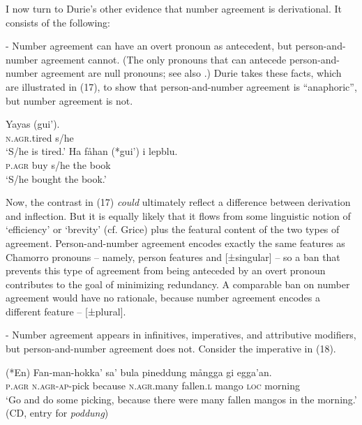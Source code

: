 \documentclass[output=paper,
modfonts
]{LSP/langsci}
\begin{document}
\begin{exe}
\begin{xlist}
I now turn to Durie's other evidence that number agreement is
derivational. It consists of the following:

- Number agreement can have an overt pronoun as antecedent, but
person-and-number agreement cannot. (The only pronouns that can antecede
person-and-number agreement are null pronouns; see also \citealt[30--31]{chung1998}.) Durie takes these facts, which are illustrated in (17), to show
that person-and-number agreement is ``anaphoric'', but number agreement
is not.

\ea
	\ea \gll  Yayas (gui').\\
		\textsc{n.agr.}tired s/he\\
		\glt `S/he is tired.'
	\ex \gll  Ha fåhan (*gui') i lepblu.\\
		\textsc{p.agr} buy s/he the book\\
		\glt `S/he bought the book.'
	\z
\z

Now, the contrast in (17) \emph{could} ultimately reflect a difference
between derivation and inflection. But it is equally likely that it
flows from some linguistic notion of `efficiency' or `brevity' (cf.
Grice) plus the featural content of the two types of agreement.
Person-and-number agreement encodes exactly the same features as
Chamorro pronouns -- namely, person features and {[}±singular{]} -- so a
ban that prevents this type of agreement from being anteceded by an
overt pronoun contributes to the goal of minimizing redundancy. A
comparable ban on number agreement would have no rationale, because
number agreement encodes a different feature -- {[}±plural{]}.

- Number agreement appears in infinitives, imperatives, and attributive
modifiers, but person-and-number agreement does not. Consider the
imperative in (18).

\ea
\gll (*En) Fan-man-hokka' sa' bula pineddung mångga gi egga'an.\\
\textsc{p.agr} \textsc{n.agr-ap-}pick because \textsc{n.agr.}many fallen.\textsc{l} mango \textsc{loc} morning\\
\glt `Go and do some picking, because there were many fallen mangos in the
morning.' (CD, entry for \emph{poddung})
\z


\end{xlist}
\end{exe}
\end{document}
